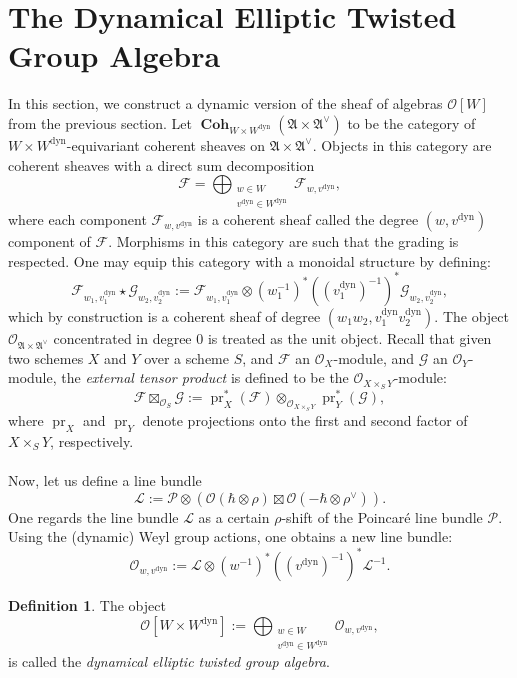 \documentclass[a4paper]{report}
\theoremstyle{theorem}
\theoremstyle{definition}
\newtheorem{definition}{Definition}
\theoremstyle{remark}
\theoremstyle{proposition}
\theoremstyle{conjecture}
\theoremstyle{lemma}
\theoremstyle{corollary}
\theoremstyle{exercise}
\theoremstyle{example}
\newcommand{\mcal}{\mathcal}
\newcommand{\on}{\operatorname}
\newcommand{\coh}{\on{\mathbf{Coh}}}
\newcommand{\dyn}{{\on{dyn}}}
\begin{document}
  \section{The Dynamical Elliptic Twisted Group Algebra}
  In this section, we construct a dynamic version of the sheaf of algebras
  $\mcal{O}[W]$ from the previous section. 
  Let $\coh_{W\times W^\dyn}(\mathfrak{A} \times \mathfrak{A}^\vee)$ to be the 
  category of $W\times W^\dyn$-equivariant coherent sheaves on 
  $\mathfrak{A} \times \mathfrak{A}^\vee$.
  Objects in this category are coherent sheaves with a direct sum decomposition
  $$\mcal{F} = \bigoplus_{\substack{w\in W\\ v^\dyn \in W^\dyn}} \mcal{F}_{w,v^\dyn},$$ where each component $\mcal{F}_{w,v^\dyn}$ is a coherent sheaf 
  called the degree $(w,v^\dyn)$ component of $\mcal{F}$. Morphisms in this 
  category are such that the grading is respected. One may equip this 
  category with a monoidal structure by defining:
  $$\mcal{F}_{w_1,v_1^\dyn} \star \mcal{G}_{w_2, v_2^{\dyn}} := \mcal{F}_{w_1,v_1^\dyn} \otimes (w_1^{-1})^\ast ((v_1^\dyn)^{-1})^\ast \mcal{G}_{w_2,v_2^\dyn},$$
  which by construction is a coherent sheaf of degree $(w_1w_2, v_1^\dyn v_2^\dyn)$. The object $\mcal{O}_{\mathfrak{A} \times \mathfrak{A}^\vee}$ concentrated
  in degree $0$ is treated as the unit object. Recall that given two schemes
  $X$ and $Y$ over a scheme $S$, and $\mcal{F}$ an $\mcal{O}_X$-module, and $\mcal{G}$ an $\mcal{O}_Y$-module, the \emph{external tensor product} is defined to be
  the $\mcal{O}_{X\times_S Y}$-module:
  $$\mcal{F} \boxtimes_{\mcal{O}_S} \mcal{G} := \on{pr}_X^\ast (\mcal{F}) \otimes_{\mcal{O}_{X\times_SY}} \on{pr}_Y^\ast (\mcal{G}),$$
  where $\on{pr}_X$ and $\on{pr}_Y$ denote projections onto the first and second 
  factor of $X\times_SY$, respectively. \\\\
  Now, let us define a line bundle 
  $$\mcal{L} := \mcal{P} \otimes \left(\mcal{O}(\hbar\otimes \rho) \boxtimes \mcal{O}(-\hbar \otimes \rho^\vee)\right).$$
  One regards the line bundle $\mcal{L}$ as a certain $\rho$-shift of the Poincar\'e line bundle $\mcal{P}$.
  Using the (dynamic) Weyl group actions, one obtains a new line bundle: $$\mcal{O}_{w,v^\dyn} := \mcal{L} \otimes (w^{-1})^\ast ((v^\dyn)^{-1})^\ast \mcal{L}^{-1}.$$ 
  \begin{definition}
      The object $$\mcal{O}[W\times W^\dyn] := \bigoplus_{\substack{w\in W\\v^\dyn\in W^\dyn}}\mcal{O}_{w,v^\dyn},$$ is called the \emph{dynamical 
      elliptic twisted group algebra}.
  \end{definition}
  
\end{document}
